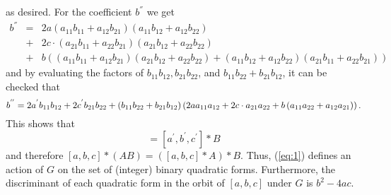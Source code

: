 \documentclass[12pt]{article}
\begin{document}
as desired.
For the coefficient $b^{''}$ we get
\begin{eqnarray*}
\label{eq:4}
b^{''}&=&2a
\left(a_{11}b_{11}+a_{12}b_{21}\right)\left(a_{11}b_{12}+a_{12}b_{22}\right) \\ 
&+&2c\cdot
\left(a_{21}b_{11}+a_{22}b_{21}\right)\left(a_{21}b_{12} +a_{22}b_{22}\right)\\
&+&b\left(\left(a_{11}b_{11} +a_{12}b_{21}\right)\left(a_{21}b_{12}
+a_{22}b_{22}\right)
+\left(a_{11}b_{12}+a_{12}b_{22}\right)\left(a_{21}b_{11}+a_{22}b_{21}\right)\right)
\end{eqnarray*}
and by evaluating the factors of $b_{11}b_{12}, b_{21}b_{22}$, and
$b_{11}b_{22}+b_{21}b_{12}$, it can be checked that
\begin{equation*}
b^{''} =2a^{'}b_{11}b_{12}+2c^{'}b_{21}b_{22} \\
\nonumber +\left(b_{11}b_{22}+b_{21}b_{12}\right)\left(2aa_{11}a_{12}+2c\cdot
a_{21}a_{22}+b\left(a_{11}a_{22}+a_{12}a_{21}\right)\right).
\end{equation*}
This shows that
\begin{equation}
[a^{''},b^{''},c^{''}]=[a^{'},b^{'},c^{'}] \ast B
\end{equation}
and therefore $[a,b,c] \ast (AB)=([a,b,c]\ast A) \ast B$. Thus,
(\ref{eq:1}) defines an action of $G$ on the set of (integer) binary
quadratic forms.
Furthermore, the discriminant of each quadratic form in the orbit of $[a,b,c]$ under $G$ is 
$b^2-4ac$.
\end{document}
